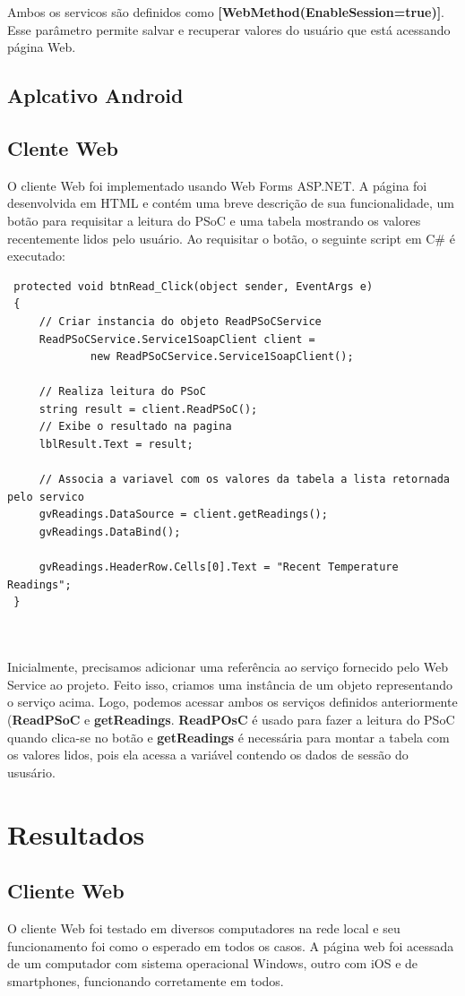 \documentclass[a4paper,12pt,titlepage]{article}
\begin{document}
		  Ambos os servicos são definidos como \textbf{[WebMethod(EnableSession=true)]}. Esse parâmetro permite salvar e recuperar valores do usuário que está acessando página Web. 
	
	\subsection{Aplcativo Android}
	
	\subsection{Clente Web}
		O cliente Web foi implementado usando Web Forms ASP.NET. A página foi desenvolvida em HTML e contém uma breve descrição de sua funcionalidade, um botão para requisitar a leitura do PSoC e uma tabela mostrando os valores recentemente lidos pelo usuário. Ao requisitar o botão, o seguinte script em C\# é executado:
			\begin{lstlisting}	
 protected void btnRead_Click(object sender, EventArgs e)
 {
	 // Criar instancia do objeto ReadPSoCService
	 ReadPSoCService.Service1SoapClient client =
			 new ReadPSoCService.Service1SoapClient();
 
	 // Realiza leitura do PSoC
	 string result = client.ReadPSoC();
	 // Exibe o resultado na pagina
	 lblResult.Text = result;
 
	 // Associa a variavel com os valores da tabela a lista retornada pelo servico
	 gvReadings.DataSource = client.getReadings();
	 gvReadings.DataBind();
 
	 gvReadings.HeaderRow.Cells[0].Text = "Recent Temperature Readings";
 }
 
 
	 		\end{lstlisting}
			Inicialmente, precisamos adicionar uma referência ao serviço fornecido pelo Web Service ao projeto. Feito isso, criamos uma instância de um objeto representando o serviço acima. Logo, podemos acessar ambos os serviços definidos anteriormente (\textbf{ReadPSoC} e \textbf{getReadings}. \textbf{ReadPOsC} é usado para fazer a leitura do PSoC quando clica-se no botão e \textbf{getReadings} é necessária para montar a tabela com os valores lidos, pois ela acessa a variável contendo os dados de sessão do ususário. 
			 
		
\section{Resultados}
	\subsection{Cliente Web}
	O cliente Web foi testado em diversos computadores na rede local e seu funcionamento foi como o esperado em todos os casos. A página web foi acessada de um computador com sistema operacional Windows, outro com iOS e de smartphones, funcionando corretamente em todos. 
	
\end{document}
